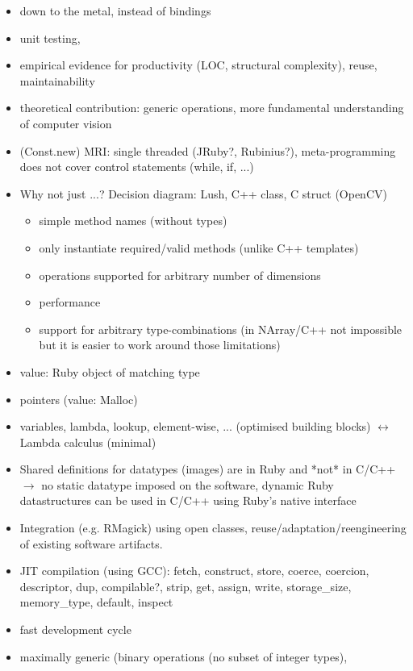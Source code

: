 \documentclass[10pt,journal,compsoc]{joser1}
\begin{document}
\begin{footnotesize}
\begin{itemize}
  \item down to the metal, instead of bindings
  \item unit testing,
  \item empirical evidence for productivity (LOC, structural complexity),
    reuse, maintainability
  \item theoretical contribution: generic operations, more fundamental
    understanding of computer vision
  \item (Const.new) MRI: single threaded (JRuby?, Rubinius?), meta-programming
    does not cover control statements (while, if, ...)
  \item Why not just ...?  Decision diagram: Lush, C++ class, C struct (OpenCV)
    \begin{itemize}
      \item simple method names (without types)
      \item only instantiate required/valid methods (unlike C++ templates)
      \item operations supported for arbitrary number of dimensions
      \item performance
      \item support for arbitrary type-combinations (in NArray/C++ not
        impossible but it is easier to work around those limitations)
    \end{itemize}
  \item value: Ruby object of matching type
  \item pointers (value: Malloc)
  \item variables, lambda, lookup, element-wise, ... (optimised building
    blocks) $\leftrightarrow$ Lambda calculus (minimal)
  \item Shared definitions for datatypes (images) are in Ruby and *not* in
    C/C++ $\rightarrow$ no static datatype imposed on the software, dynamic
    Ruby datastructures can be used in C/C++ using Ruby's native interface
  \item Integration (e.g. RMagick) using open classes,
    reuse/adaptation/reengineering of existing software artifacts.
  \item JIT compilation (using GCC): fetch, construct, store, coerce, coercion,
    descriptor, dup, compilable?, strip, get, assign, write, storage\_size,
    memory\_type, default, inspect
  \item fast development cycle
  \item maximally generic (binary operations (no subset of integer types),

\end{itemize}
\end{footnotesize}
\end{document}
